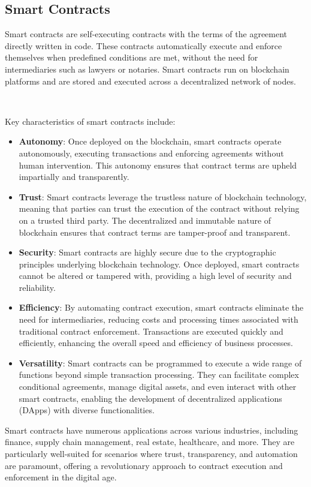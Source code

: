 \subsection{Smart Contracts}
Smart contracts are self-executing contracts with the terms of the agreement directly written in code. These contracts automatically execute and enforce themselves when predefined conditions are met, without the need for intermediaries such as lawyers or notaries. Smart contracts run on blockchain platforms and are stored and executed across a decentralized network of nodes.

~

Key characteristics of smart contracts include:
\begin{itemize}
    \item \textbf{Autonomy}: Once deployed on the blockchain, smart contracts operate autonomously, executing transactions and enforcing agreements without human intervention. This autonomy ensures that contract terms are upheld impartially and transparently.
    \item \textbf{Trust}: Smart contracts leverage the trustless nature of blockchain technology, meaning that parties can trust the execution of the contract without relying on a trusted third party. The decentralized and immutable nature of blockchain ensures that contract terms are tamper-proof and transparent.
    \item \textbf{Security}: Smart contracts are highly secure due to the cryptographic principles underlying blockchain technology. Once deployed, smart contracts cannot be altered or tampered with, providing a high level of security and reliability.
    \item \textbf{Efficiency}: By automating contract execution, smart contracts eliminate the need for intermediaries, reducing costs and processing times associated with traditional contract enforcement. Transactions are executed quickly and efficiently, enhancing the overall speed and efficiency of business processes.
    \item \textbf{Versatility}: Smart contracts can be programmed to execute a wide range of functions beyond simple transaction processing. They can facilitate complex conditional agreements, manage digital assets, and even interact with other smart contracts, enabling the development of decentralized applications (DApps) with diverse functionalities.
\end{itemize}

Smart contracts have numerous applications across various industries, including finance, supply chain management, real estate, healthcare, and more. They are particularly well-suited for scenarios where trust, transparency, and automation are paramount, offering a revolutionary approach to contract execution and enforcement in the digital age.


